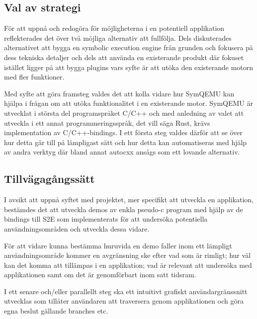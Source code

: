 \subsection{Val av strategi} 
För att uppnå och redogöra för möjligheterna i en
potentiell applikation reflekterades det över två möjliga alternativ att
fullfölja. Dels diskuterades alternativet att bygga en symbolic execution engine
från grunden och fokusera på dess tekniska detaljer och dels att använda en
existerande produkt där fokuset istället ligger på att bygga plugins vars syfte
är att utöka den existerande motorn med fler funktioner. 

Med syfte att göra framsteg valdes det att kolla vidare hur SymQEMU kan hjälpa i
frågan om att utöka funktionalitet i en existerande motor. SymQEMU är utvecklat
i största del programspråket C/C++ och med anledning av valet att utveckla i ett
annat programmeringsspråk, det vill säga Rust, krävs implementation av
C/C++-bindings. I ett första steg valdes därför att  se över hur detta går till
på lämpligast sätt och hur detta kan automatiseras med hjälp av andra verktyg
där bland annat autocxx ansågs som ett lovande alternativ. 

\subsection{Tillvägagångssätt} 
I avsikt att uppnå syftet med projektet, mer
specifikt att utveckla en applikation, bestämdes det att utveckla demos av enkla
pseudo-c program med hjälp av de bindings till S2E som implementerats för att
undersöka potentiella användningsområden och utveckla dessa vidare. 

För att vidare kunna bestämma huruvida en demo faller inom ett lämpligt
användningsområde kommer en avgränsning ske efter vad som är rimligt; hur väl
kan det komma att tillämpas i en applikation; vad är relevant att undersöka med
applikationen samt om det är genomförbart inom satt tidsram. 

I ett senare och/eller parallellt steg ska ett intuitivt grafiskt användargränssnitt
utvecklas som tillåter användaren att traversera genom applikationen och göra
egna beslut gällande branches etc. 



%  

